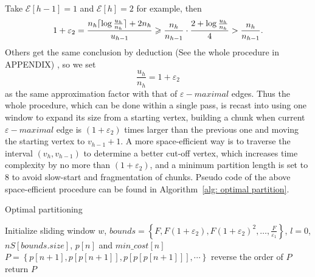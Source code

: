 \documentclass[runningheads,a4paper]{llncs}
\begin{document}
Take $ \mathcal{E}[h-1]=1 $ and $ \mathcal{E}[h]=2 $ for example, then
\begin{displaymath}
\noindent
1+\varepsilon_{2}=\frac{n_{h}\lceil\log \frac{u_{h}}{n_{h}}\rceil+2n_{h}}{u_{h-1}}\geqslant \frac{n_{h}}{n_{h-1}}\cdot \frac{2+\log \frac{u_{h}}{n_{h}}}{4}>\frac{n_{h}}{n_{h-1}}.
\end{displaymath}
Others get the same conclusion by deduction (See the whole procedure in APPENDIX)
, so we set
\begin{equation}
\frac{u_{h}}{n_{h}}=1+\varepsilon_2
\end{equation}
as the same approximation factor with that of $\varepsilon-maximal$ edges.
Thus the whole procedure, which can be done within a single pass, is recast into using one window to expand its size from a starting vertex, building a chunk when current $\varepsilon-maximal$ edge is $\left(1+\varepsilon_{2}\right)$ times larger than the previous one and moving the starting vertex to $v_{h-1}+1$. A more space-efficient way is to traverse the interval $\left(v_{h},v_{h-1}\right)$ to determine a better cut-off vertex, which increases time complexity by no more than $\left(1+\varepsilon_{2}\right)$, and a minimum partition length is set to 8 to avoid slow-start and fragmentation of chunks.
Pseudo code of the above space-efficient procedure can be found in Algorithm~\ref{alg: optimal partition}.

\begin{algorithm} \label{alg: optimal partition}
	\caption{Optimal partitioning}
	Initialize sliding window $ w $, $ bounds=\left\lbrace F,F(1+\varepsilon_2),F(1+\varepsilon_2)^2,\dots, \frac{F}{\varepsilon_1} \right\rbrace $, $ l=0 $, $ nS[bounds.size] $, $p\left[ n \right]$ and $min\_cost \left[n\right] $\;
	$ P=\left\lbrace p\left[n+1\right], p\left[p\left[n+1\right]\right], p\left[p\left[p\left[n+1\right]\right]\right],\cdots\right\rbrace $\;
	reverse the order of $ P $\;
	return $ P $\;
\end{algorithm}
\end{document}
